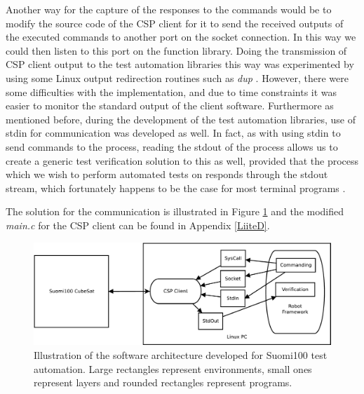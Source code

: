 \documentclass[english,12pt,a4paper,pdftex,elec,utf8]{aaltothesis}
\begin{document}
Another way for the capture of the responses to the commands would be to modify the source code of the CSP client for it to send the received outputs of the executed commands to another port on the socket connection. In this way we could then listen to this port on the function library. Doing the transmission of CSP client output to the test automation libraries this way was experimented by using some Linux output redirection routines such as \textit{dup} \cite{linuxproginterface}. However, there were some difficulties with the implementation, and due to time constraints it was easier to monitor the standard output of the client software. Furthermore as mentioned before, during the development of the test automation libraries, use of stdin for communication was developed as well. In fact, as with using stdin to send commands to the process, reading the stdout of the process allows us to create a generic test verification solution to this as well, provided that the process which we wish to perform automated tests on responds through the stdout stream, which fortunately happens to be the case for most terminal programs \cite{linuxproginterface}.
\par   
The solution for the communication is illustrated in Figure \ref{cspauto} and the modified \textit{main.c} for the CSP client can be found in Appendix \ref{LiiteD}.
\begin{figure}[h!]
\centering
\includegraphics[scale=0.5]{cspautomation}
\caption{Illustration of the software architecture developed for Suomi100 test automation. Large rectangles represent environments, small ones represent layers and rounded rectangles represent programs.}
\label{cspauto}
\end{figure} 
\end{document}
